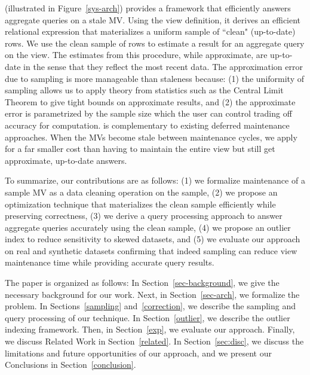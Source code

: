 \svcfull (\svc illustrated in Figure~\ref{sys-arch}) provides a framework that efficiently answers aggregate queries on a stale MV.
Using the view definition, it derives an efficient relational expression that materializes a uniform sample of ``clean" (up-to-date) rows.
We use the clean sample of rows to estimate a result for an aggregate query on the view.
The estimates from this procedure, while approximate, are up-to-date in the sense that they reflect the most recent data. 
The approximation error due to sampling is more manageable than staleness because: (1) the uniformity of sampling allows us to apply theory from statistics such as the Central Limit Theorem to give tight bounds on approximate results, and (2) the approximate error is parametrized by the sample size which the user can control trading off accuracy for computation.
\svc is complementary to existing deferred maintenance approaches.
When the MVs become stale between maintenance cycles, we apply \svc for a far smaller cost than having to maintain the entire view but still get approximate, up-to-date answers.


To summarize, our contributions are as follows: (1) we formalize maintenance of a sample MV as a data cleaning operation on the sample, (2) we propose an optimization technique that materializes the clean sample efficiently while preserving correctness, (3) we derive a query processing approach to answer aggregate queries accurately using the clean sample, (4) we propose an outlier index to reduce sensitivity to skewed datasets, and (5) we evaluate our approach on real and synthetic datasets confirming that indeed sampling can reduce view maintenance time while providing accurate query results. 

The paper is organized as follows: 
In Section~\ref{sec-background}, we give the necessary background for our work.
Next, in Section~\ref{sec-arch}, we formalize the problem.
In Sections~\ref{sampling} and~\ref{correction}, we describe the sampling and query processing of our technique.
In Section~\ref{outlier}, we describe the outlier indexing framework.
Then, in Section~\ref{exp}, we evaluate our approach.
Finally, we discuss Related Work in Section~\ref{related}.
In Section~\ref{sec:disc}, we discuss the limitations and future opportunities of our approach, and we present our Conclusions in Section~\ref{conclusion}.
